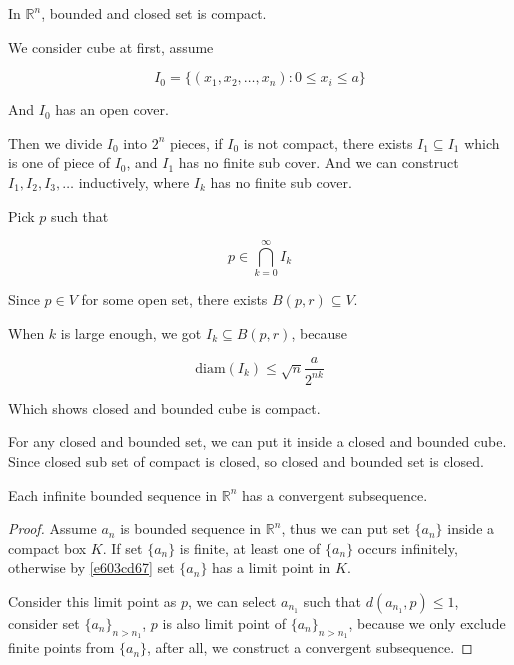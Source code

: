 \begin{thm}\label{heine-borel}
    In $\mathbb{R}^n$, bounded and closed set is compact. 

    We consider cube at first, assume 

    \[
        I_0 =  \{ (x_1,x_2,\dots, x_n):  0 \le x_i \le a\}
    \]

    And $I_0$ has an open cover.

    Then we divide $I_0$ into $2^n$ pieces, if $I_0$ is not compact, 
    there exists $I_1 \subseteq I_1$ which is one of piece of $I_0$, and 
    $I_1$ has no finite sub cover. And we can construct $I_1,I_2,I_3,\dots$ 
    inductively, where $I_k$ has no finite sub cover.

    Pick $p$ such that

    \[
        p \in \bigcap_{k=0}^{\infty}I_k
    \]

    Since $p \in V$ for some open set, there exists $B(p, r) \subseteq V$. 

    When $k$ is large enough, we got $I_k \subseteq B(p,r)$, because

    \[
        \mathrm{diam}(I_k) \le \sqrt{n} \frac{a}{2^{nk}}
    \]

    Which shows closed and bounded cube is compact.

    For any closed and bounded set, we can put it inside a closed and bounded cube.
    Since closed sub set of compact is closed, so closed and bounded set is closed.
\end{thm}


\begin{thm}\label{metric-space-bolzano-weierstrass}
    Each infinite bounded sequence in $\mathbb{R}^n$
 has a convergent subsequence. 
\end{thm}

\begin{proof}
    Assume $a_n$ is bounded sequence in $\mathbb{R}^n$, thus we can put set $\{ a_n \}$
    inside a compact box $K$. If set $ \{ a_n \} $ is finite, at least one of $\{ a_n \}$
    occurs infinitely, otherwise by \cref{e603cd67} set $\{ a_n \}$ has a limit point in $K$.

    Consider this limit point as $p$, we can select $a_{n_1}$ such that $d(a_{n_1}, p) \le 1$,
    consider set $\{ a_n \}_{n > n_1}$, $p$ is also limit point of $\{ a_n \}_{n > n_1}$, because 
    we only exclude finite points from $\{ a_n \}$, after all, we construct a convergent subsequence.
\end{proof}

